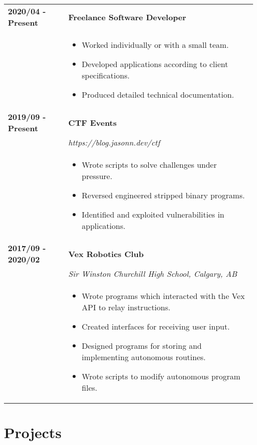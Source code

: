 \documentclass[letterpaper]{article}
\begin{document}
        \begin{tabular}{p{} p{}} 
            \textbf{2020/04 - Present} & \large\textbf{Freelance Software Developer} \\
            & \begin{itemize}
                \item Worked individually or with a small team.
                \item Developed applications according to client specifications.
                \item Produced detailed technical documentation.
            \end{itemize}
            \\
            \textbf{2019/09 - Present} & \large\textbf{CTF Events} \\
            & \emph{https://blog.jasonn.dev/ctf} \\
            & \begin{itemize}
                \item Wrote scripts to solve challenges under pressure.
                \item Reversed engineered stripped binary programs.
                \item Identified and exploited vulnerabilities in applications. 
            \end{itemize}
            \\
            \textbf{2017/09 - 2020/02} & \large\textbf{Vex Robotics Club} \\
            & \emph{Sir Winston Churchill High School, Calgary, AB} \\
            & \begin{itemize}
                \item Wrote programs which interacted with the Vex API to relay instructions.
                \item Created interfaces for receiving user input.
                \item Designed programs for storing and implementing autonomous routines.
                \item Wrote scripts to modify autonomous program files.
            \end{itemize}
        \end{tabular}

    \section*{Projects}
\end{document}
